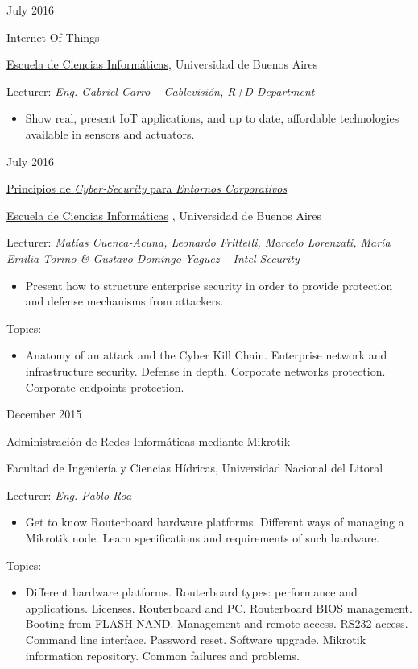 \documentclass[a4paper,10pt]{article}
\newlength{\cvcolumngapwidth}
\newlength{\cvleftcolumnwidth}
\newlength{\cvrightcolumnwidth}
\newcommand{\cvdurationstyle}[1]{{\small\cvdurationfont\textcolor{cvdurationcolor}{#1}}}
\newcommand{\cvheadingstyle}[1]{{\normalsize\cvheadingfont\textcolor{cvheadingcolor}{#1}}}
\newlength{\cvafteritemskipamount}
\newlength{\cvparskip}
\newcommand{\cvitem}[2]{
    \begin{minipage}[t]{\cvleftcolumnwidth}
        \raggedleft #1
    \end{minipage}%
    \hspace{\cvcolumngapwidth}%
    \begin{minipage}[t]{\cvrightcolumnwidth}
        \setlength{\parskip}{\cvparskip} #2
    \end{minipage}

    \vspace{\cvafteritemskipamount}
}
\begin{document}
\cvitem {
    \cvdurationstyle{July 2016}
}{
    \cvheadingstyle{Internet Of Things}
    
    \href{https://eci2016.dc.uba.ar/}{Escuela de Ciencias Informáticas}, Universidad de Buenos Aires
    
    Lecturer: \textit{Eng. Gabriel Carro -- Cablevisión, R+D Department}
    
    \begin{itemize}[leftmargin=*]
        \item Show real, present IoT applications, and up to date, affordable technologies available in sensors and actuators.
    \end{itemize}
}
\cvitem {
    \cvdurationstyle{July 2016}
}{
    \cvheadingstyle{\href{https://eci2016.dc.uba.ar/n3.pdf}{Principios de \textit{Cyber-Security} para \textit{Entornos Corporativos}}}
    
    \href{https://eci2016.dc.uba.ar/}{Escuela de Ciencias Informáticas} , Universidad de Buenos Aires
    
    Lecturer: \textit{Matías Cuenca-Acuna, Leonardo Frittelli, Marcelo Lorenzati, María Emilia Torino \& Gustavo Domingo Yaguez -- Intel Security}
    
    \begin{itemize}[leftmargin=*]
        \item Present how to structure enterprise security in order to provide protection and defense mechanisms from attackers.
    \end{itemize}
    
    Topics:
    \small{
    \begin{itemize}
        \item Anatomy of an attack and the Cyber Kill Chain. Enterprise network and infrastructure security. Defense in depth. Corporate networks protection. Corporate endpoints protection.
    \end{itemize}{}
    }
}
\cvitem {
    \cvdurationstyle{December 2015}
}{
    \cvheadingstyle{Administración de Redes Informáticas mediante Mikrotik}
    
    Facultad de Ingeniería y Ciencias Hídricas, Universidad Nacional del Litoral
    
    Lecturer: \textit{Eng. Pablo Roa}
    
    \begin{itemize}[leftmargin=*]
        \item Get to know Routerboard hardware platforms. Different ways of managing a Mikrotik node.  Learn specifications and requirements of such hardware.
    \end{itemize}
    
    Topics:
    \small{
    \begin{itemize}
        \item Different hardware platforms. Routerboard types: performance and applications. Licenses. Routerboard and PC. Routerboard BIOS management. Booting from FLASH NAND. Management and remote access. RS232 access. Command line interface. Password reset. Software upgrade. Mikrotik information repository. Common failures and problems.
    \end{itemize}{}
    }
}
\end{document}
